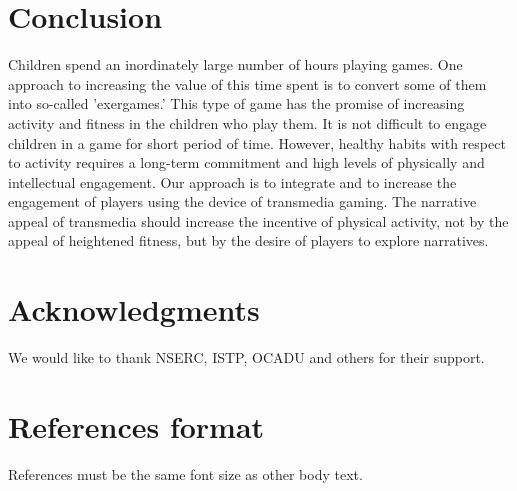 \documentclass{SIGCHI2015LaTex/sigchi}
\begin{document}
%

\section{Conclusion}
Children spend an inordinately large number of hours playing games. One approach to increasing the value of this time spent is to convert some of them into so-called 'exergames.' This type of game has the promise of increasing activity and fitness in the children who play them. It is not difficult to engage children in a game for short period of time. However, healthy habits with respect to activity requires a long-term commitment and high levels of physically and intellectual engagement. Our approach is to integrate and to increase the engagement of players using the device of transmedia gaming. The narrative appeal of transmedia should increase the incentive of physical activity, not by the appeal of heightened fitness, but by the desire of players to explore narratives. 

\section{Acknowledgments}

We would like to thank NSERC, ISTP, OCADU and others for their support.

%
%
%
%
%
\balance

\section{References format}
References must be the same font size as other body text.



\end{document}
